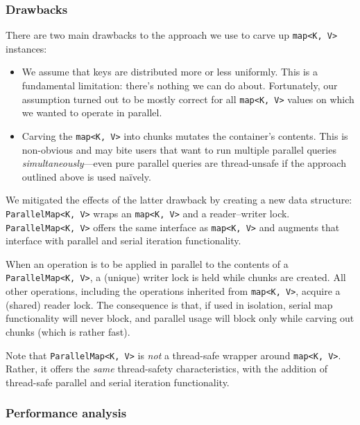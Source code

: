 \documentclass[a4paper,12pt]{article}
\newcommand{\typename}[2]{\texttt{#2}} %
\begin{document}
\subsubsection{Drawbacks}

There are two main drawbacks to the approach we use to carve up \typename{std}{map<K, V>} instances:

\begin{itemize}
	\item We assume that keys are distributed more or less uniformly. This is a fundamental limitation: there's nothing we can do about. Fortunately, our assumption turned out to be mostly correct for all \typename{std}{map<K, V>} values on which we wanted to operate in parallel.
	
	\item Carving the \typename{std}{map<K, V>} into chunks mutates the container's contents. This is non-obvious and may bite users that want to run multiple parallel queries \emph{simultaneously}---even pure parallel queries are thread-unsafe if the approach outlined above is used na\"ively.
\end{itemize}

We mitigated the effects of the latter drawback by creating a new data structure: \typename{stride::util::parallel}{ParallelMap<K, V>} wraps an \typename{std}{map<K, V>} and a reader--writer lock. \typename{stride::util::parallel}{ParallelMap<K, V>} offers the same interface as \typename{std}{map<K, V>} and augments that interface with parallel and serial iteration functionality.

When an operation is to be applied in parallel to the contents of a \typename{stride::util::parallel}{ParallelMap<K, V>}, a (unique) writer lock is held while chunks are created. All other operations, including the operations inherited from \typename{std}{map<K, V>}, acquire a (shared) reader lock. The consequence is that, if used in isolation, serial map functionality will never block, and parallel usage will block only while carving out chunks (which is rather fast).

Note that \typename{stride::util::parallel}{ParallelMap<K, V>} is \emph{not} a thread-safe wrapper around \typename{std}{map<K, V>}. Rather, it offers the \emph{same} thread-safety characteristics, with the addition of thread-safe parallel and serial iteration functionality.

\subsubsection{Performance analysis}
\end{document}
